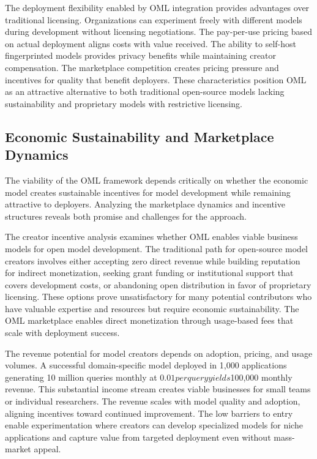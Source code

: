 The deployment flexibility enabled by OML integration provides advantages over traditional licensing. Organizations can experiment freely with different models during development without licensing negotiations. The pay-per-use pricing based on actual deployment aligns costs with value received. The ability to self-host fingerprinted models provides privacy benefits while maintaining creator compensation. The marketplace competition creates pricing pressure and incentives for quality that benefit deployers. These characteristics position OML as an attractive alternative to both traditional open-source models lacking sustainability and proprietary models with restrictive licensing.

\subsection{Economic Sustainability and Marketplace Dynamics}

The viability of the OML framework depends critically on whether the economic model creates sustainable incentives for model development while remaining attractive to deployers. Analyzing the marketplace dynamics and incentive structures reveals both promise and challenges for the approach.

The creator incentive analysis examines whether OML enables viable business models for open model development. The traditional path for open-source model creators involves either accepting zero direct revenue while building reputation for indirect monetization, seeking grant funding or institutional support that covers development costs, or abandoning open distribution in favor of proprietary licensing. These options prove unsatisfactory for many potential contributors who have valuable expertise and resources but require economic sustainability. The OML marketplace enables direct monetization through usage-based fees that scale with deployment success.

The revenue potential for model creators depends on adoption, pricing, and usage volumes. A successful domain-specific model deployed in 1,000 applications generating 10 million queries monthly at $0.01 per query yields $100,000 monthly revenue. This substantial income stream creates viable businesses for small teams or individual researchers. The revenue scales with model quality and adoption, aligning incentives toward continued improvement. The low barriers to entry enable experimentation where creators can develop specialized models for niche applications and capture value from targeted deployment even without mass-market appeal.

